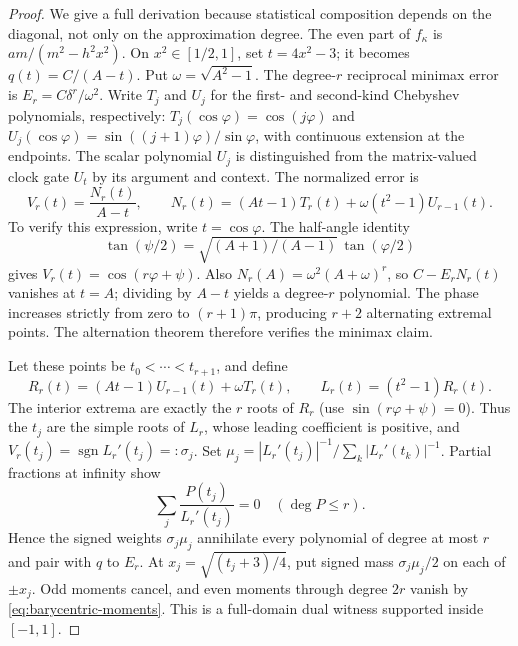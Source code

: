 \begin{proof}
We give a full derivation because statistical composition depends on
the diagonal, not only on the approximation degree.
The even part of $f_\kappa$ is $am/(m^2-h^2x^2)$.
On $x^2\in[1/2,1]$, set $t=4x^2-3$; it becomes $q(t)=C/(A-t)$.
Put $\omega=\sqrt{A^2-1}$. The degree-$r$ reciprocal minimax error is
$E_r=C\delta^r/\omega^2$. Write $T_j$ and $U_j$ for the first- and
second-kind Chebyshev polynomials, respectively:
$T_j(\cos\varphi)=\cos(j\varphi)$ and
$U_j(\cos\varphi)=\sin((j+1)\varphi)/\sin\varphi$, with continuous
extension at the endpoints. The scalar polynomial $U_j$ is distinguished
from the matrix-valued clock gate $U_t$ by its argument and context.
The normalized error is
\[
 V_r(t)=\frac{N_r(t)}{A-t},\qquad
 N_r(t)=(At-1)T_r(t)+\omega(t^2-1)U_{r-1}(t).
\]
To verify this expression, write $t=\cos\varphi$.
The half-angle identity
\[
 \tan(\psi/2)=\sqrt{(A+1)/(A-1)}\,\tan(\varphi/2)
\]
gives $V_r(t)=\cos(r\varphi+\psi)$. Also
$N_r(A)=\omega^2(A+\omega)^r$, so $C-E_rN_r(t)$ vanishes at
$t=A$; dividing by $A-t$ yields a degree-$r$ polynomial.
The phase increases strictly from zero to $(r+1)\pi$, producing
$r+2$ alternating extremal points. The alternation theorem therefore
verifies the minimax claim.

Let these points be $t_0<\cdots<t_{r+1}$, and define
\[
 R_r(t)=(At-1)U_{r-1}(t)+\omega T_r(t),\qquad
 L_r(t)=(t^2-1)R_r(t).
\]
The interior extrema are exactly the $r$ roots of $R_r$ (use
$\sin(r\varphi+\psi)=0$). Thus the $t_j$ are the simple roots of
$L_r$, whose leading coefficient is positive, and
$V_r(t_j)=\operatorname{sgn}L_r'(t_j)=:\sigma_j$.
Set $\mu_j=|L_r'(t_j)|^{-1}/\sum_k|L_r'(t_k)|^{-1}$.
Partial fractions at infinity show
\begin{equation}\label{eq:barycentric-moments}
 \sum_j\frac{P(t_j)}{L_r'(t_j)}=0\quad(\deg P\leq r).
\end{equation}
Hence the signed weights $\sigma_j\mu_j$ annihilate every
polynomial of degree at most $r$ and pair with $q$ to $E_r$.
At $x_j=\sqrt{(t_j+3)/4}$, put signed mass $\sigma_j\mu_j/2$
on each of $\pm x_j$. Odd moments cancel, and even moments through
degree $2r$ vanish by \eqref{eq:barycentric-moments}. This is a
full-domain dual witness supported inside $[-1,1]$.


\end{proof}
